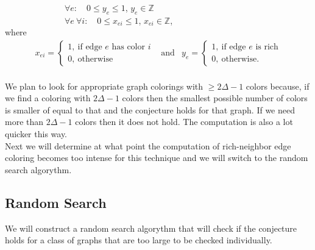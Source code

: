 \documentclass[12pt,a4paper]{amsart}
\theoremstyle{definition} %
\theoremstyle{plain} %
\newcommand{\Z}{\mathbb Z}
\begin{document}
\ \ \ \ \ \ \ \ \ \ \ \ \ \ $\forall e: \quad 0 \leq y_{e} \leq 1$, $y_{e} \in \Z$\\

\ \ \ \ \ \ \ \ \ \ \ \ \ \ $\forall e \ \forall i: \quad 0 \leq x_{ei} \leq 1$, $x_{ei} \in \Z$,\\

where
\begin{align*}        x_{ei} = \begin{cases}
            1, \  \text{if edge $e$ has color $i$} \\
            0, \  \text{otherwise}
    \end{cases} & \text{and} & 
    y_{e} = \begin{cases}
        1, \  \text{if edge $e$ is rich} \\
        0, \  \text{otherwise.}
    \end{cases}
\end{align*}\\

We plan to look for appropriate graph colorings with $\geq 2 \Delta - 1$ colors because, if we find a coloring with $2 \Delta - 1$ colors then the smallest possible number of colors is smaller of equal to that and the conjecture holds for that graph. If we need more than $2 \Delta - 1$ colors then it does not hold. The computation is also a lot quicker this way.\\

Next we will determine at what point the computation of rich-neighbor edge coloring becomes too intense for this technique and we will switch to the random search algorythm.
\pagebreak

\subsection{Random Search}

We will construct a random search algorythm that will check if the conjecture holds for a class of graphs that are too large to be checked individually.
\end{document}
